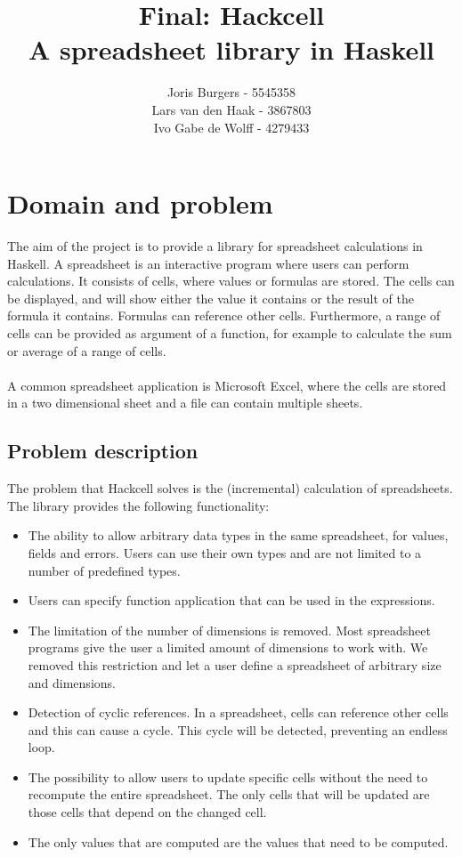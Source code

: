 \documentclass{article}
\title{
	Final: Hackcell \\
	\vskip 0.5cm
	\large{A spreadsheet library in Haskell}
}
\author{Joris Burgers - 5545358\\ Lars van den Haak - 3867803\\ Ivo Gabe de Wolff - 4279433}
\begin{document}
	\maketitle
	
	\section{Domain and problem}
	The aim of the project is to provide a library for spreadsheet calculations in Haskell. A spreadsheet is an interactive program where users can perform calculations. It consists of cells, where values or formulas are stored. The cells can be displayed, and will show either the value it contains or the result of the formula it contains. Formulas can reference other cells. Furthermore, a range of cells can be provided as argument of a function, for example to calculate the sum or average of a range of cells. 
\\\\	
	A common spreadsheet application is Microsoft Excel, where the cells are stored in a two dimensional sheet and a file can contain multiple sheets.
	
	\subsection{Problem description}
	The problem that Hackcell solves is the (incremental) calculation of spreadsheets. The library provides the following functionality:
	\begin{itemize}
		\item The ability to allow arbitrary data types in the same spreadsheet, for values, fields and errors. Users can use their own types and are not limited to a number of predefined types.
		\item Users can specify function application that can be used in the expressions.
		\item The limitation of the number of dimensions is removed. Most spreadsheet programs give the user a limited amount of dimensions to work with. We removed this restriction and let a user define a spreadsheet of arbitrary size and dimensions.
		\item Detection of cyclic references. In a spreadsheet, cells can reference other cells and this can cause a cycle. This cycle will be detected, preventing an endless loop.
		\item The possibility to allow users to update specific cells without the need to recompute the entire spreadsheet. The only cells that will be updated are those cells that depend on the changed cell.
		\item The only values that are computed are the values that need to be computed.
	\end{itemize}	
	
\end{document}
